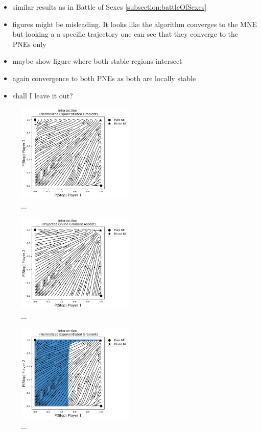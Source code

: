 \begin{itemize}
    \item similar results as in Battle of Sexes \ref{subsection:battleOfSexes}
    \item figures might be misleading. It looks like the algorithm converges to the MNE but looking a a specific trajectory one can see that they converge to the PNEs only
    \item maybe show figure where both stable regions intersect
    \item again convergence to both PNEs as both are locally stable 
    \item shall I leave it out?
\end{itemize}

\begin{figure}
    \centering
    \includegraphics[width=0.5\textwidth]{logos/Intersection1.png}
    \caption{...}
    \label{Intersection1}
\end{figure}

\begin{figure}
    \centering
    \includegraphics[width=0.5\textwidth]{logos/Intersection2.png}
    \caption{...}
    \label{Intersection2}
\end{figure}

\begin{figure}
    \centering
    \includegraphics[width=0.5\textwidth]{logos/Intersection3.png}
    \caption{...}
    \label{Intersection3}
\end{figure}

